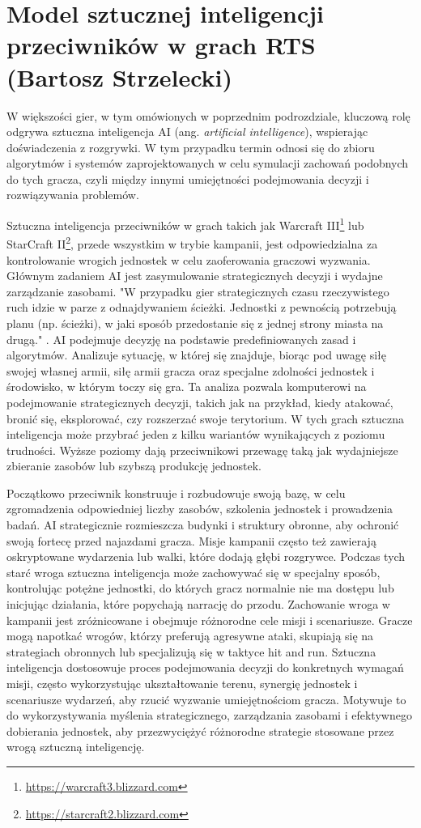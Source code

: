 \section{Model sztucznej inteligencji przeciwników w grach RTS (Bartosz Strzelecki)}\label{s:ai_wpr}
W większości gier, w tym omówionych w poprzednim podrozdziale, kluczową rolę odgrywa sztuczna inteligencja AI (ang.  \textit{artificial intelligence}), wspierając doświadczenia z rozgrywki.
W tym przypadku termin odnosi się do zbioru algorytmów i systemów zaprojektowanych w celu symulacji
zachowań podobnych do tych gracza, czyli między innymi umiejętności podejmowania decyzji i rozwiązywania problemów.

Sztuczna inteligencja przeciwników w grach takich jak Warcraft III\footnote{\url{https://warcraft3.blizzard.com}} lub StarCraft II\footnote{\url{https://starcraft2.blizzard.com}}, przede wszystkim w trybie kampanii,
jest odpowiedzialna za kontrolowanie wrogich jednostek w celu zaoferowania graczowi wyzwania. Głównym zadaniem AI jest zasymulowanie
strategicznych decyzji i wydajne zarządzanie zasobami.
"W przypadku gier strategicznych czasu rzeczywistego ruch idzie w parze z odnajdywaniem ścieżki. Jednostki z pewnością potrzebują planu (np. ścieżki), 
w jaki sposób przedostanie się z jednej strony miasta na drugą." \cite{units}.
AI podejmuje decyzję na podstawie predefiniowanych zasad i algorytmów. Analizuje sytuację, w której się znajduje, biorąc pod uwagę
siłę swojej własnej armii, siłę armii gracza oraz specjalne zdolności jednostek i środowisko, w którym toczy się gra.
Ta analiza pozwala komputerowi na podejmowanie strategicznych decyzji, takich jak na przykład, kiedy atakować, bronić się, eksplorować, czy rozszerzać swoje terytorium.
W tych grach sztuczna inteligencja może przybrać jeden z kilku wariantów wynikających z poziomu trudności. Wyższe poziomy
dają przeciwnikowi przewagę taką jak wydajniejsze zbieranie zasobów lub szybszą produkcję jednostek.

Początkowo przeciwnik konstruuje i rozbudowuje swoją bazę, w celu zgromadzenia odpowiedniej liczby zasobów, szkolenia jednostek i prowadzenia badań.
AI strategicznie rozmieszcza budynki i struktury obronne, aby ochronić swoją fortecę przed najazdami gracza. 
Misje kampanii często też zawierają oskryptowane wydarzenia lub walki, które dodają głębi rozgrywce. Podczas tych starć wroga sztuczna inteligencja
może zachowywać się w specjalny sposób, kontrolując potężne jednostki, do których gracz normalnie nie ma dostępu lub inicjując działania, które popychają
narrację do przodu.
Zachowanie wroga w kampanii jest zróżnicowane i obejmuje różnorodne cele misji i scenariusze. Gracze mogą napotkać wrogów, którzy preferują agresywne ataki,
skupiają się na strategiach obronnych lub specjalizują się w taktyce hit and run. Sztuczna inteligencja dostosowuje proces podejmowania decyzji do
konkretnych wymagań misji, często wykorzystując ukształtowanie terenu, synergię jednostek i scenariusze wydarzeń, aby rzucić wyzwanie umiejętnościom gracza.
Motywuje to do wykorzystywania myślenia strategicznego, zarządzania zasobami i efektywnego dobierania jednostek, aby przezwyciężyć różnorodne strategie stosowane przez wrogą sztuczną inteligencję.

